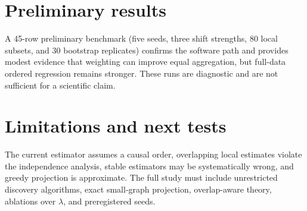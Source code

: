 \documentclass[11pt]{article}
\begin{document}
\section{Preliminary results}
A 45-row preliminary benchmark (five seeds, three shift strengths, 80 local subsets, and 30 bootstrap replicates) confirms the software path and provides modest evidence that weighting can improve equal aggregation, but full-data ordered regression remains stronger. These runs are diagnostic and are not sufficient for a scientific claim.

\section{Limitations and next tests}
The current estimator assumes a causal order, overlapping local estimates violate the independence analysis, stable estimators may be systematically wrong, and greedy projection is approximate. The full study must include unrestricted discovery algorithms, exact small-graph projection, overlap-aware theory, ablations over $\lambda$, and preregistered seeds.



\end{document}
